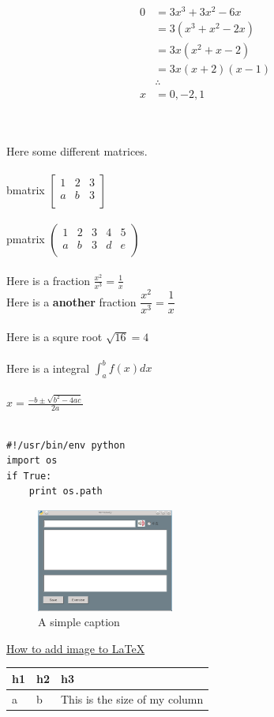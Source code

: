 \documentclass{article}
\begin{document}
\begin{align} 
0 &= 3x^3+3x^2-6x \\  
&= 3( x^3 + x^2 - 2x) \\
&= 3x(x^2 + x -2) \\
&=3x(x+2)(x-1) \\
& \therefore \\
x &= 0, -2, 1 \\ \\
\end{align} \\ \\
Here some different matrices.\\ \\
bmatrix
$
\begin{bmatrix}
  1 & 2 & 3 \\
  a & b & 3 \\
\end{bmatrix}
$ \\ \\
pmatrix
$
\begin{pmatrix}
  1 & 2 & 3 & 4 & 5 \\
  a & b & 3 & d & e \\
\end{pmatrix}
$ \\ \\
Here is a fraction $\frac{x^2}{x^3} = \frac{1}{x}$ \\
Here is a \textbf{another }fraction $\dfrac{x^2}{x^3} = \dfrac{1}{x}$ \\ \\
Here is a squre root $\sqrt{16} = 4$ \\ \\
Here is a integral $\int_{a}^{b}f(x)dx$ \\ \\
$x = \frac{-b \pm \sqrt{b^2-4ac}}{2a}$ \\ \\
\begin{verbatim}
#!/usr/bin/env python
import os
if True:
    print os.path
\end{verbatim}
\begin{figure}[ht!]
\centering
\includegraphics[width=45mm]{main.png}
\caption{A simple caption}
\label{overflow}
\end{figure}
\href{http://stackoverflow.com/questions/3134187/how-to-add-a-jpg-image-in-latex}{How to add image to LaTeX} \\
\begin{table}
\centering
  \begin{tabular}{|l|l|p{1cm}|}
\hline
  h1 & h2 & h3 \\
\hline
  a  & b  & This is the size of my column \\
\hline
  \end{tabular}
\end{table}
\end{document}
